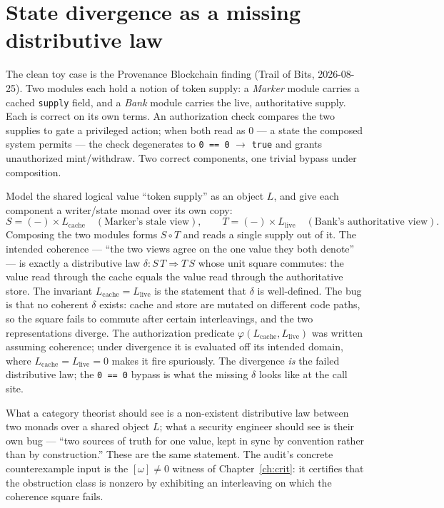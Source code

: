 \section{State divergence as a missing distributive law}
\label{sec:security-toy}

The clean toy case is the Provenance Blockchain finding (Trail of Bits,
2026-08-25). Two modules each hold a notion of token supply: a \emph{Marker}
module carries a cached \texttt{supply} field, and a \emph{Bank} module carries
the live, authoritative supply. Each is correct on its own terms. An
authorization check compares the two supplies to gate a privileged action; when
both read as $0$ --- a state the composed system permits --- the check
degenerates to \texttt{0 == 0} $\rightarrow$ \texttt{true} and grants
unauthorized mint/withdraw. Two correct components, one trivial bypass under
composition.

Model the shared logical value ``token supply'' as an object $L$, and give each
component a writer/state monad over its own copy:
\[
  S = (-)\times L_{\mathrm{cache}}\quad(\text{Marker's stale view}),
  \qquad
  T = (-)\times L_{\mathrm{live}}\quad(\text{Bank's authoritative view}).
\]
Composing the two modules forms $S\circ T$ and reads a single supply out of it.
The intended coherence --- ``the two views agree on the one value they both
denote'' --- is exactly a distributive law
$\delta\colon S\,T\Rightarrow T\,S$ whose unit square commutes: the value read
through the cache equals the value read through the authoritative store. The
invariant $L_{\mathrm{cache}}=L_{\mathrm{live}}$ is the statement that $\delta$
is well-defined. The bug is that no coherent $\delta$ exists: cache and store are
mutated on different code paths, so the square fails to commute after certain
interleavings, and the two representations diverge. The authorization predicate
$\varphi(L_{\mathrm{cache}},L_{\mathrm{live}})$ was written assuming coherence;
under divergence it is evaluated off its intended domain, where
$L_{\mathrm{cache}}=L_{\mathrm{live}}=0$ makes it fire spuriously. The divergence
\emph{is} the failed distributive law; the \texttt{0 == 0} bypass is what the
missing $\delta$ looks like at the call site.

\begin{remark}\label{rem:security-two-readings}
What a category theorist should see is a non-existent distributive law between
two monads over a shared object $L$; what a security engineer should see is their
own bug --- ``two sources of truth for one value, kept in sync by convention
rather than by construction.'' These are the same statement. The audit's
concrete counterexample input is the $[\omega]\neq0$ witness of
Chapter~\ref{ch:crit}: it certifies that the obstruction class is nonzero by
exhibiting an interleaving on which the coherence square fails.
\end{remark}

